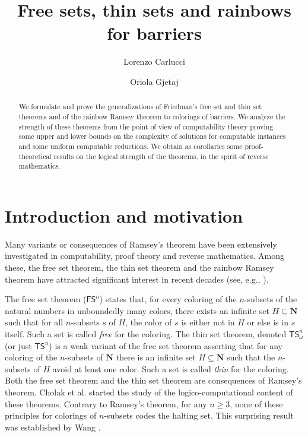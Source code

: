 \documentclass{amsart}
\title[Free sets, thin sets and rainbows for barriers]{\texorpdfstring{Free sets, thin sets and rainbows for barriers}{Free sets, thin sets and rainbows for barriers}}
\author[L. Carlucci]{Lorenzo Carlucci}
\author[O. Gjetaj]{Oriola Gjetaj}
\theoremstyle{plain}
\theoremstyle{plain}
\newcommand{\om}{\omega}
\newcommand\Nat{\mathbf{N}}
\newcommand\TS{\mathsf{TS}}
\newcommand\FS{\mathsf{FS}}
\begin{document}
\begin{abstract}
We formulate and prove the generalizations of Friedman's free set and thin set theorems and of the rainbow Ramsey theorem to colorings of barriers. We analyze the strength of these theorems from the point of view of computability theory proving some upper and lower bounds on the complexity of solutions for computable instances and some uniform computable reductions. 
We obtain as corollaries some proof-theoretical results on the logical strength of the theorems, in the spirit of reverse mathematics.

\end{abstract}

\maketitle


\section{Introduction and motivation}

Many variants or consequences of Ramsey’s theorem have been extensively investigated in computability, proof theory and reverse mathematics. Among these, the free set theorem, the thin set theorem and the rainbow Ramsey theorem have attracted significant interest in recent decades (see, e.g., \cite{Cholak_Giusto_Hirst_Jockusch_2005,wang2014some,Pat:16,cholak2020thin,Liu2022-LIUTRM}). 

The free set theorem ($\FS^n$) states that, for every coloring of the $n$-subsets of the natural numbers in unboundedly many colors, there exists an infinite set $H\subseteq \Nat$ such that for all $n$-subsets $s$ of $H$, the color of $s$ is either not in $H$ or else is in $s$ itself. Such a set is called {\em free} for the coloring. The thin set theorem, denoted $\TS^n_\om$ (or just $\TS^n$) is a weak variant of the free set theorem asserting that for any coloring of the $n$-subsets of $\Nat$ there is an infinite set $H\subseteq\Nat$ such that the $n$-subsets of $H$ avoid at least one color. Such a set is called {\em thin} for the coloring.
Both the free set theorem and the thin set theorem are consequences of Ramsey's theorem.  Cholak et al. \cite{Cholak_Giusto_Hirst_Jockusch_2005} started the study of the logico-computational content of these theorems. Contrary to Ramsey's theorem, for any $n\geq 3$, none of these principles for colorings of $n$-subsets codes the halting set. This surprising result was established by Wang \cite{wang2014some}.
\end{document}

